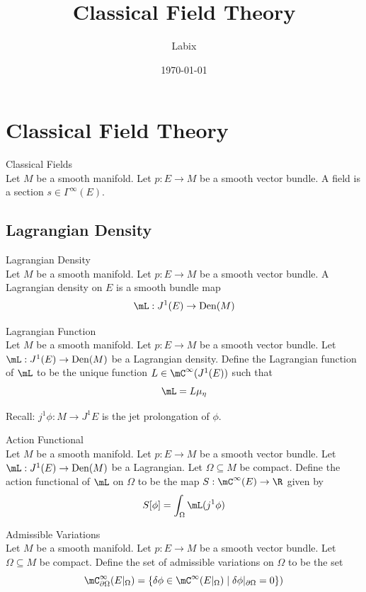 \documentclass[a4paper]{article}
\title{Classical Field Theory}
\author{Labix}
\date{\today}
\begin{document}
\maketitle
\pagebreak
\tableofcontents

\pagebreak
\section{Classical Field Theory}

\begin{defn}{Classical Fields}{}\\
Let $M$ be a smooth manifold. Let $p:E\to M$ be a smooth vector bundle. A field is a section $s\in\Gamma^\infty(E)$. 
\end{defn}

\subsection{Lagrangian Density}
\begin{defn}{Lagrangian Density}{}\\
Let $M$ be a smooth manifold. Let $p:E\to M$ be a smooth vector bundle. A Lagrangian density on $E$ is a smooth bundle map $$\mL:J^1(E)\to\text{Den}(M)$$
\end{defn}

\begin{defn}{Lagrangian Function}{}\\
Let $M$ be a smooth manifold. Let $p:E\to M$ be a smooth vector bundle. Let $\mL:J^1(E)\to\text{Den}(M)$ be a Lagrangian density. Define the Lagrangian function of $\mL$ to be the unique function $L\in\mC^\infty(J^1(E))$ such that $$\mL=L\mu_\eta$$
\end{defn}

Recall: $j^1\phi:M\to J^1E$ is the jet prolongation of $\phi$. 

\begin{defn}{Action Functional}{}\\
Let $M$ be a smooth manifold. Let $p:E\to M$ be a smooth vector bundle. Let $\mL:J^1(E)\to\text{Den}(M)$ be a Lagrangian. Let $\Omega\subseteq M$ be compact. Define the action functional of $\mL$ on $\Omega$ to be the map $S:\mC^\infty(E)\to\R$ given by $$S[\phi]=\int_\Omega\mL(j^1\phi)$$
\end{defn}

\begin{defn}{Admissible Variations}{}\\
Let $M$ be a smooth manifold. Let $p:E\to M$ be a smooth vector bundle. Let $\Omega\subseteq M$ be compact. Define the set of admissible variations on $\Omega$ to be the set $$\mC^\infty_{\partial\Omega}(E|_\Omega)=\{\delta\phi\in\mC^\infty(E|_\Omega)\;|\;\delta\phi|_{\partial\Omega}=0\})$$
\end{defn}
\end{document}
